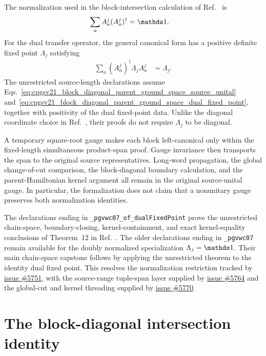 \documentclass{article}
\begin{document}
The normalization used in the block-intersection calculation of
Ref.~\cite{PerezGarcia2007MPSReps} is
\begin{align}
  \sum_a A^j_a(A^j_a)^\dagger
    &=
    \Id.
  \label{eq:cpgsv21_block_diagonal_parent_ground_space_source_unital}
\end{align}
For the dual transfer operator, the general canonical form has a positive
definite fixed point $\Lambda_j$ satisfying
\begin{align}
  \sum_a (A^j_a)^\dagger\Lambda_j A^j_a
    &=
    \Lambda_j.
  \label{eq:cpgsv21_block_diagonal_parent_ground_space_dual_fixed_point}
\end{align}
The unrestricted source-length declarations assume
Eqs.~\ref{eq:cpgsv21_block_diagonal_parent_ground_space_source_unital}
and~\ref{eq:cpgsv21_block_diagonal_parent_ground_space_dual_fixed_point},
together with positivity of the dual fixed-point data. Unlike the diagonal
coordinate choice in Ref.~\cite{PerezGarcia2007MPSReps}, their proofs do not
require $\Lambda_j$ to be diagonal.

A temporary square-root gauge makes each block left-canonical only within the
fixed-length simultaneous product-span proof. Gauge invariance then transports
the span to the original source representatives. Long-word propagation, the
global change-of-cut comparison, the block-diagonal boundary calculation, and
the parent-Hamiltonian kernel argument all remain in the original
source-unital gauge. In particular, the formalization does not claim that a
nonunitary gauge preserves both normalization identities.

The declarations ending in
\texttt{\_pgvwc07\_of\_dualFixedPoint} prove the unrestricted chain-space,
boundary-closing, kernel-containment, and exact kernel-equality conclusions of
Theorem~12 in Ref.~\cite{PerezGarcia2007MPSReps}. The older declarations ending
in \texttt{\_pgvwc07} remain available for the doubly normalized specialization
$\Lambda_j=\Id$. Their main chain-space capstone follows by applying the
unrestricted theorem to the identity dual fixed point. This resolves the
normalization restriction tracked by
\href{https://github.com/LionSR/TNLean/issues/5751}{issue \#5751}, with the
source-range tuple-span layer supplied by
\href{https://github.com/LionSR/TNLean/issues/5764}{issue \#5764} and the
global-cut and kernel threading supplied by
\href{https://github.com/LionSR/TNLean/issues/5770}{issue \#5770}.

\section{The block-diagonal intersection identity}
\end{document}
